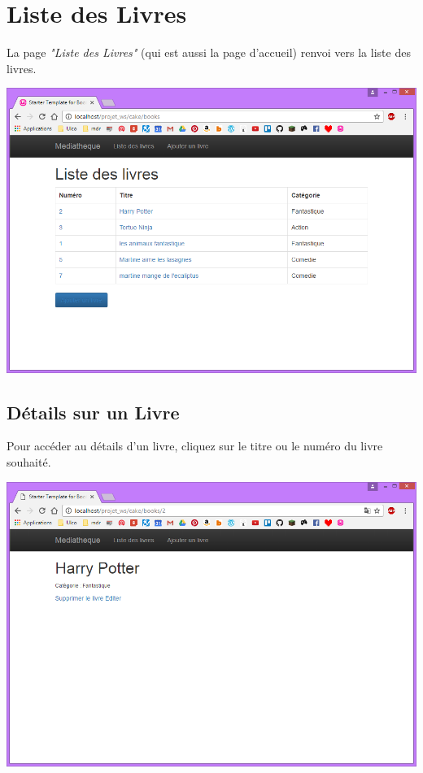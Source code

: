 \documentclass{report}
\begin{document}
		\section{Liste des Livres}
		La page \textit{"Liste des Livres"} (qui est aussi la page d'accueil) renvoi vers la liste des livres.	
		\begin{center}
			\includegraphics[scale=0.4]{img/manuel/ListeDesLivres.png}  
		\end{center}
		
			\subsection{D\'{e}tails sur un Livre}
			Pour acc\'{e}der au d\'{e}tails d'un livre, cliquez sur le titre ou le num\'{e}ro du livre souhait\'{e}.
			\begin{center}
				\includegraphics[scale=0.4]{img/manuel/DetailLivre.png}  
			\end{center}
			
\end{document}
